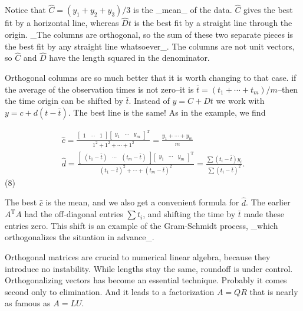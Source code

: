 Notice that \(\widehat{C}=(y_{1}+y_{2}+y_{3})/3\) is the _mean_ of the data. \(\widehat{C}\) gives the best fit by a horizontal line, whereas \(\widehat{D}t\) is the best fit by a straight line through the origin. _The columns are orthogonal, so the sum of these two separate pieces is the best fit by any straight line whatsoever_. The columns are not unit vectors, so \(\widehat{C}\) and \(\widehat{D}\) have the length squared in the denominator.

Orthogonal columns are so much better that it is worth changing to that case. if the average of the observation times is not zero--it is \(\bar{t}=(t_{1}+\cdots+t_{m})/m\)--then the time origin can be shifted by \(\bar{t}\). Instead of \(y=C+Dt\) we work with \(y=c+d(t-\bar{t})\). The best line is the same! As in the example, we find

\[\begin{array}{c}\widehat{c}=\frac{\begin{bmatrix}1&\cdots&1 \end{bmatrix}\begin{bmatrix}y_{1}&\cdots&y_{m}\end{bmatrix}^{\mathrm{T}}}{1^{2 }+1^{2}+\cdots+1^{2}}=\frac{y_{1}+\cdots+y_{m}}{m}\\ \widehat{d}=\frac{\begin{bmatrix}(t_{1}-\bar{t})&\cdots&(t_{m}-\bar{t}) \end{bmatrix}\begin{bmatrix}y_{1}&\cdots&y_{m}\end{bmatrix}^{\mathrm{T}}}{(t_{ 1}-\bar{t})^{2}+\cdots+(t_{m}-\bar{t})^{2}}=\frac{\sum(t_{i}-\bar{t})y_{i}}{ \sum(t_{i}-\bar{t})^{2}}.\end{array}\] (8)

The best \(\widehat{c}\) is the mean, and we also get a convenient formula for \(\widehat{d}\). The earlier \(A^{\mathrm{T}}A\) had the off-diagonal entries \(\sum t_{i}\), and shifting the time by \(\bar{t}\) made these entries zero. This shift is an example of the Gram-Schmidt process, _which orthogonalizes the situation in advance_.

Orthogonal matrices are crucial to numerical linear algebra, because they introduce no instability. While lengths stay the same, roundoff is under control. Orthogonalizing vectors has become an essential technique. Probably it comes second only to elimination. And it leads to a factorization \(A=QR\) that is nearly as famous as \(A=LU\).

 